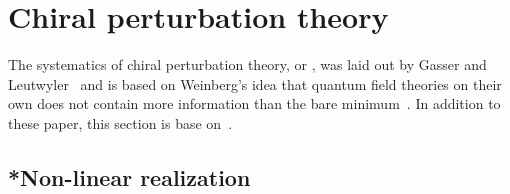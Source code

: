 \section{Chiral perturbation theory}
\label{section: chiral perturbation theory}

The systematics of chiral perturbation theory, or \chpt, was laid out by Gasser and Leutwyler~\autocite{gasserChiralPerturbationTheory1984,gasserChiralPerturbationTheory1985} and is based on Weinberg's idea that quantum field theories on their own does not contain more information than the bare minimum~\autocite{weinbergPhenomenologicalLagrangians1979}.
In addition to these paper, this section is base on~\autocite{eckerChiralPerturbationTheory1995,fearingExtensionChiralPerturbation1996,schererIntroductionChiralPerturbation2002}.


\subsection{*Non-linear realization}

